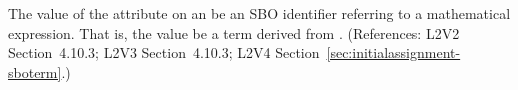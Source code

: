 The value of the  attribute on an \InitialAssignment {} be an
SBO identifier referring to a mathematical expression.  That is, the value
 be a term derived from \sbomathformula.  (References: L2V2 Section~4.10.3;
L2V3 Section~4.10.3; L2V4 Section~\ref{sec:initialassignment-sboterm}.)
